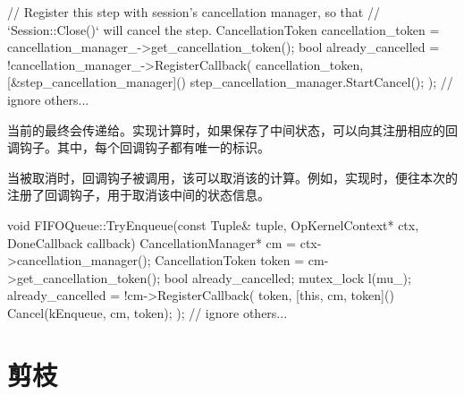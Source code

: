 \begin{content}
\begin{leftbar}
\begin{c++}
{  // Register this step with session's cancellation manager, so that
  // `Session::Close()` will cancel the step.
  CancellationToken cancellation_token =
      cancellation_manager_->get_cancellation_token();
  bool already_cancelled = !cancellation_manager_->RegisterCallback(
      cancellation_token, [&step_cancellation_manager]() {
        step_cancellation_manager.StartCancel();
      });
  // ignore others...
}
\end{c++}
\end{leftbar}

当前的最终会传递给。实现计算时，如果保存了中间状态，可以向其注册相应的回调钩子。其中，每个回调钩子都有唯一的标识。

当被取消时，回调钩子被调用，该可以取消该的计算。例如，实现时，便往本次的注册了回调钩子，用于取消该中间的状态信息。

\begin{leftbar}
\begin{c++}
void FIFOQueue::TryEnqueue(const Tuple& tuple, OpKernelContext* ctx,
                           DoneCallback callback) {
  CancellationManager* cm = ctx->cancellation_manager();
  CancellationToken token = cm->get_cancellation_token();
  bool already_cancelled;
  {
    mutex_lock l(mu_);
    already_cancelled = !cm->RegisterCallback(
        token, [this, cm, token]() { Cancel(kEnqueue, cm, token); });
  }
  // ignore others...
}
\end{c++}
\end{leftbar}

\end{content}

\section{剪枝}
\label{sec:graph-operation-prune}

